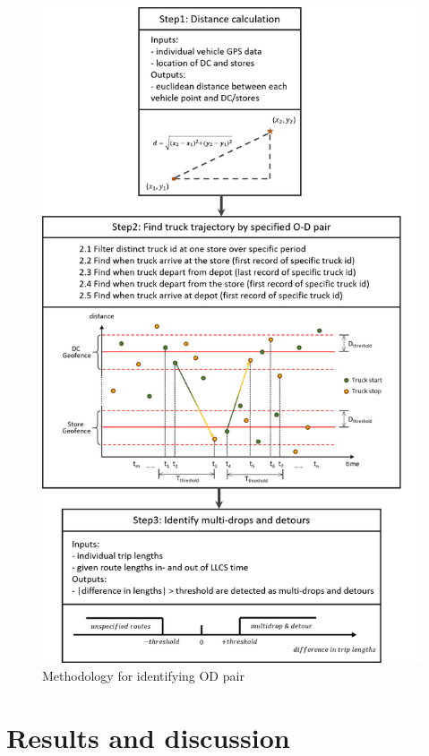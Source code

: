 \documentclass[preprint,12pt,3p]{elsarticle}
\begin{document}
\begin{figure}[H] %
\centering %
\includegraphics[scale=0.7]{figure2.png} %
\caption{Methodology for identifying OD pair} %
\label{fig2} %
\end{figure}




\section{Results and discussion}
\label{sec4}
\end{document}
